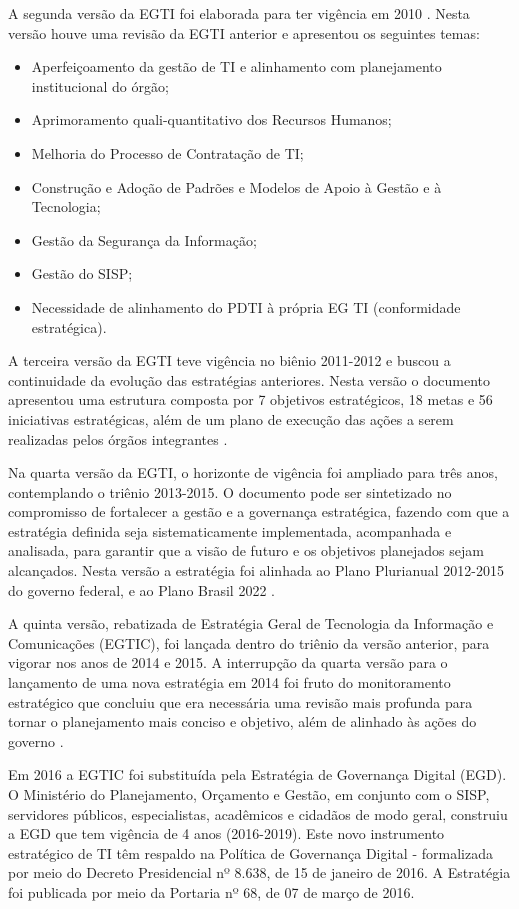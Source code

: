 A segunda versão da EGTI foi elaborada para ter vigência em 2010 \cite{egti:10}. Nesta versão houve uma revisão da EGTI anterior e apresentou os seguintes temas:
\begin{itemize}
\item Aperfeiçoamento da gestão de TI e alinhamento com planejamento institucional do órgão; 
\item Aprimoramento quali-quantitativo dos Recursos Humanos; 
\item Melhoria do Processo de Contratação de TI; 
\item Construção e Adoção de Padrões e Modelos de Apoio à Gestão e à Tecnologia; 
\item Gestão da Segurança da Informação; 
\item Gestão do SISP; 
\item Necessidade de alinhamento do PDTI à própria EG TI (conformidade estratégica).
\end{itemize}

A terceira versão da EGTI teve vigência no biênio 2011-2012 e buscou a continuidade da evolução das estratégias anteriores. Nesta versão o documento apresentou uma estrutura composta por 7 objetivos estratégicos, 18 metas e 56 iniciativas estratégicas, além de um plano de execução das ações a serem realizadas pelos órgãos integrantes \cite{egti:11}.

Na quarta versão da EGTI, o horizonte de vigência foi ampliado para três anos, contemplando o triênio 2013-2015. O documento pode ser sintetizado no compromisso de fortalecer a gestão e a governança estratégica, fazendo com que a estratégia definida seja sistematicamente implementada, acompanhada e analisada, para garantir que a visão de futuro e os objetivos planejados 
sejam alcançados. Nesta versão a estratégia foi alinhada ao Plano Plurianual 2012-2015 do governo federal, e ao Plano Brasil 2022 \cite{egti:13}. 

A quinta versão, rebatizada de Estratégia Geral de Tecnologia da Informação e Comunicações (EGTIC), foi lançada dentro do triênio da versão anterior, para vigorar nos anos de 2014 e 2015. A interrupção da quarta versão para o lançamento de uma nova estratégia em 2014 foi fruto do monitoramento estratégico que concluiu que era necessária uma revisão mais profunda para tornar o planejamento mais conciso e objetivo, além de alinhado às ações do governo \cite{egti:14}.

Em 2016 a EGTIC foi substituída pela Estratégia de Governança Digital (EGD). O Ministério do Planejamento, Orçamento e Gestão, em conjunto com o SISP, servidores públicos, especialistas, acadêmicos e cidadãos de modo geral, construiu a EGD que tem vigência de 4 anos (2016-2019). Este novo instrumento estratégico de TI têm respaldo na Política de Governança Digital - formalizada por meio do Decreto Presidencial nº 8.638, de 15 de janeiro de 2016.  A Estratégia foi publicada por meio da  Portaria nº 68, de 07 de março de 2016. 

